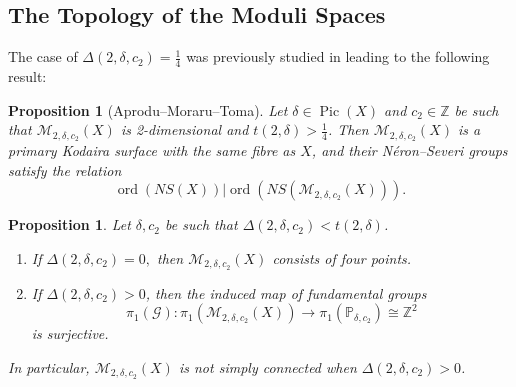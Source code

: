 \documentclass{article}[12pt]
\newtheorem{proposition}[theorem]{Proposition}
\theoremstyle{definition}
\theoremstyle{remark}
\newcommand \Z{\mathbb Z}
\numberwithin{equation}{section}
\newcommand \mc{\mathcal}
\newcommand \mb{\mathbb}
\DeclareMathOperator{\Pic}{Pic}
\DeclareMathOperator{\ord}{ord}
\begin{document}
\subsection{The Topology of the Moduli Spaces}
The case of $\Delta(2,\delta,c_2)=\frac{1}{4}$ was previously studied in \cite{ApMorTom} leading to the following result:
\begin{proposition}[Aprodu--Moraru--Toma]\label{2dim}
	Let $\delta \in \Pic(X)$ and $c_2 \in \Z$ be such that $\mc{M}_{2,\delta,c_2}(X)$ is 2-dimensional and $t(2,\delta)>\frac{1}{4}$. Then $\mc{M}_{2,\delta,c_2}(X)$ is a primary Kodaira surface with the same fibre as $X$, and their N\'eron--Severi groups satisfy the relation $$\ord(NS(X))|\ord(NS(\mc{M}_{2,\delta,c_2}(X))).$$
\end{proposition}
\begin{proposition}
	Let $\delta,c_2$ be such that $\Delta(2,\delta,c_2)< t(2,\delta)$.
	\begin{enumerate}
		\item[i.] If $\Delta(2,\delta,c_2)=0,$ then $\mc{M}_{2,\delta,c_2}(X)$ consists of four points. 
		\item[ii.] If $\Delta(2,\delta,c_2)>0$, then the induced map of fundamental groups $$\pi_1(\mc{G}):\pi_1(\mc{M}_{2,\delta,c_2}(X))\to \pi_1(\mb{P}_{\delta,c_2})\cong \Z^2$$ is surjective. 
	\end{enumerate}
	In particular, $\mc{M}_{2,\delta,c_2}(X)$ is not simply connected when $\Delta(2,\delta,c_2)>0$. 
\end{proposition}
\end{document}
